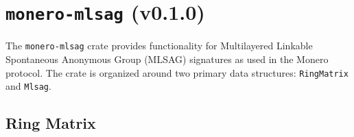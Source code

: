 \documentclass[12pt,a4paper]{article}
\begin{document}





\section{\texttt{monero-mlsag} (v0.1.0)}

The \texttt{monero-mlsag} crate provides functionality for Multilayered Linkable Spontaneous Anonymous Group (MLSAG) signatures as used in the Monero protocol.
The crate is organized around two primary data structures: \texttt{RingMatrix} and \texttt{Mlsag}.

\subsection{Ring Matrix}
\end{document}
